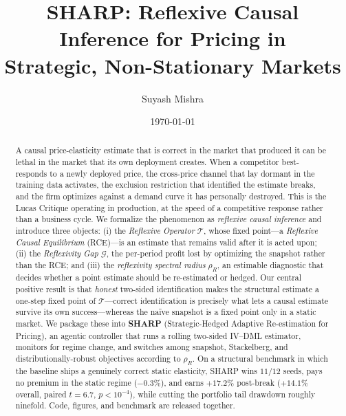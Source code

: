\documentclass[11pt]{article}
\title{\textbf{SHARP}: Reflexive Causal Inference for Pricing in\\ Strategic, Non-Stationary Markets}
\author[1]{Suyash Mishra}
\affil[1]{Independent Researcher \quad \texttt{mishrasuyash-strat.github.io}}
\date{\today}
\newcommand{\Tcal}{\mathcal{T}}
\newcommand{\Gcal}{\mathcal{G}}
\newcommand{\rhoR}{\rho_{R}}
\begin{document}
\maketitle

\begin{abstract}
A causal price-elasticity estimate that is correct in the market that produced it can be
lethal in the market that its own deployment creates. When a competitor best-responds to a
newly deployed price, the cross-price channel that lay dormant in the training data activates,
the exclusion restriction that identified the estimate breaks, and the firm optimizes against a
demand curve it has personally destroyed. This is the Lucas Critique operating in production, at
the speed of a competitive response rather than a business cycle. We formalize the phenomenon as
\emph{reflexive causal inference} and introduce three objects: (i) the \emph{Reflexive Operator}
$\Tcal$, whose fixed point---a \emph{Reflexive Causal Equilibrium} (RCE)---is an estimate that
remains valid after it is acted upon; (ii) the \emph{Reflexivity Gap} $\Gcal$, the per-period
profit lost by optimizing the snapshot rather than the RCE; and (iii) the \emph{reflexivity
spectral radius} $\rhoR$, an estimable diagnostic that decides whether a point estimate should be
re-estimated or hedged. Our central positive result is that \emph{honest} two-sided identification
makes the structural estimate a one-step fixed point of $\Tcal$---correct identification is
precisely what lets a causal estimate survive its own success---whereas the na\"ive snapshot is a
fixed point only in a static market. We package these into \textbf{SHARP} (Strategic-Hedged Adaptive
Re-estimation for Pricing), an agentic controller that runs a rolling two-sided
IV--DML estimator, monitors for regime change, and switches among snapshot, Stackelberg, and
distributionally-robust objectives according to $\rhoR$. On a structural benchmark in which the
baseline ships a genuinely correct static elasticity, SHARP wins $11/12$ seeds, pays no premium
in the static regime ($-0.3\%$), and earns $+17.2\%$ post-break ($+14.1\%$ overall, paired
$t=6.7$, $p<10^{-4}$), while cutting the portfolio tail drawdown roughly ninefold. Code, figures,
and benchmark are released together.
\end{abstract}
\end{document}
